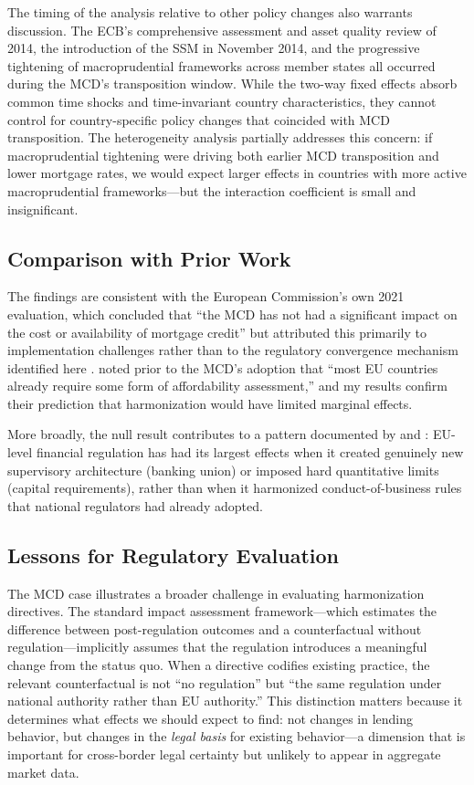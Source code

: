 \documentclass[12pt]{article}
\begin{document}
The timing of the analysis relative to other policy changes also warrants discussion. The ECB's comprehensive assessment and asset quality review of 2014, the introduction of the SSM in November 2014, and the progressive tightening of macroprudential frameworks across member states all occurred during the MCD's transposition window. While the two-way fixed effects absorb common time shocks and time-invariant country characteristics, they cannot control for country-specific policy changes that coincided with MCD transposition. The heterogeneity analysis partially addresses this concern: if macroprudential tightening were driving both earlier MCD transposition and lower mortgage rates, we would expect larger effects in countries with more active macroprudential frameworks---but the interaction coefficient is small and insignificant.

\subsection{Comparison with Prior Work}

The findings are consistent with the European Commission's own 2021 evaluation, which concluded that ``the MCD has not had a significant impact on the cost or availability of mortgage credit'' but attributed this primarily to implementation challenges rather than to the regulatory convergence mechanism identified here \citep{european_commission_2021_eval}. \citet{whitehead_scanlon_2014_mortgage} noted prior to the MCD's adoption that ``most EU countries already require some form of affordability assessment,'' and my results confirm their prediction that harmonization would have limited marginal effects.

More broadly, the null result contributes to a pattern documented by \citet{dagostino_2023_regulatory} and \citet{fernandez_vidaurreta_2023_mortgage}: EU-level financial regulation has had its largest effects when it created genuinely new supervisory architecture (banking union) or imposed hard quantitative limits (capital requirements), rather than when it harmonized conduct-of-business rules that national regulators had already adopted.

\subsection{Lessons for Regulatory Evaluation}

The MCD case illustrates a broader challenge in evaluating harmonization directives. The standard impact assessment framework---which estimates the difference between post-regulation outcomes and a counterfactual without regulation---implicitly assumes that the regulation introduces a meaningful change from the status quo. When a directive codifies existing practice, the relevant counterfactual is not ``no regulation'' but ``the same regulation under national authority rather than EU authority.'' This distinction matters because it determines what effects we should expect to find: not changes in lending behavior, but changes in the \textit{legal basis} for existing behavior---a dimension that is important for cross-border legal certainty but unlikely to appear in aggregate market data.
\end{document}
